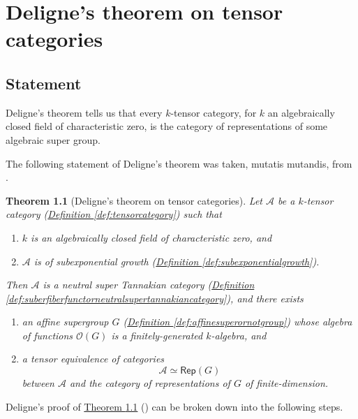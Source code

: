 \documentclass[a4paper,10pt]{scrreprt}
\theoremstyle{definition}
\theoremstyle{plain}
\newtheorem{theorem}{Theorem}[section]
\theoremstyle{remark}
\begin{document}
\chapter{Deligne's theorem on tensor categories} \label{ch:delignestheorem}
\section{Statement}
Deligne's theorem tells us that every $k$-tensor category, for $k$ an algebraically closed field of characteristic zero, is the category of representations of some algebraic super group.

The following statement of Deligne's theorem was taken, mutatis mutandis, from \cite{nlab-deligne-theorem}.

\begin{theorem}[Deligne's theorem on tensor categories]
  \label{thm:delignestheorem}
  Let $\mathscr{A}$ be a $k$-tensor category (\hyperref[def:tensorcategory]{Definition \ref*{def:tensorcategory}}) such that
  \begin{enumerate}
    \item $k$ is an algebraically closed field of characteristic zero, and

    \item $\mathscr{A}$ is of subexponential growth (\hyperref[def:subexponentialgrowth]{Definition \ref*{def:subexponentialgrowth}}).
  \end{enumerate}

  Then $\mathscr{A}$ is a neutral super Tannakian category (\hyperref[def:suberfiberfunctorneutralsupertannakiancategory]{Definition \ref*{def:suberfiberfunctorneutralsupertannakiancategory}}), and there exists 
  \begin{enumerate}
    \item an affine supergroup $G$ (\hyperref[def:affinesuperornotgroup]{Definition \ref*{def:affinesuperornotgroup}}) whose algebra of functions $\mathscr{O}(G)$ is a finitely-generated $k$-algebra, and 

    \item a tensor equivalence of categories
      \begin{equation*}
        \mathscr{A} \simeq \mathsf{Rep}(G)
      \end{equation*}
      between $\mathscr{A}$ and the category of representations of $G$ of finite-dimension.
  \end{enumerate}
\end{theorem}
Deligne's proof of \hyperref[thm:delignestheorem]{Theorem \ref*{thm:delignestheorem}} (\cite{deligne-categories-tensorielle}) can be broken down into the following steps.
\end{document}

